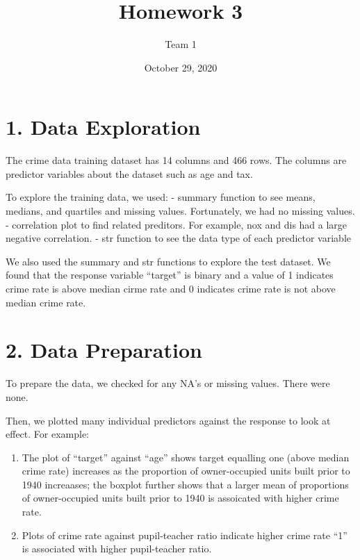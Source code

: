 \documentclass[
]{article}
\title{Homework 3}
\author{Team 1}
\date{October 29, 2020}
\providecommand{\tightlist}{%
  \setlength{\itemsep}{0pt}\setlength{\parskip}{0pt}}
\begin{document}
\maketitle

\hypertarget{data-exploration}{%
\section{1. Data Exploration}\label{data-exploration}}

The crime data training dataset has 14 columns and 466 rows. The columns
are predictor variables about the dataset such as age and tax.

To explore the training data, we used: - summary function to see means,
medians, and quartiles and missing values. Fortunately, we had no
missing values. - correlation plot to find related preditors. For
example, nox and dis had a large negative correlation. - str function to
see the data type of each predictor variable

We also used the summary and str functions to explore the test dataset.
We found that the response variable ``target'' is binary and a value of
1 indicates crime rate is above median cirme rate and 0 indicates crime
rate is not above median crime rate.

\hypertarget{data-preparation}{%
\section{2. Data Preparation}\label{data-preparation}}

To prepare the data, we checked for any NA's or missing values. There
were none.

Then, we plotted many individual predictors against the response to look
at effect. For example:

\begin{enumerate}
\def\labelenumi{\arabic{enumi}.}
\tightlist
\item
  The plot of ``target'' against ``age'' shows target equalling one
  (above median crime rate) increases as the proportion of
  owner-occupied units built prior to 1940 increaases; the boxplot
  further shows that a larger mean of proportions of owner-occupied
  units built prior to 1940 is assoicated with higher crime rate.
\item
  Plots of crime rate against pupil-teacher ratio indicate higher crime
  rate ``1'' is associated with higher pupil-teacher ratio.
\end{enumerate}
\end{document}
